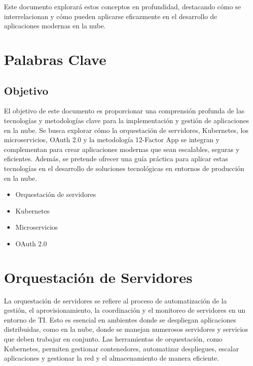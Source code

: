 \documentclass{article}
\begin{document}
Este documento explorará estos conceptos en profundidad, destacando cómo se interrelacionan y cómo pueden aplicarse eficazmente en el desarrollo de aplicaciones modernas en la nube.\\

\section{Palabras Clave}
\subsection{Objetivo}
El objetivo de este documento es proporcionar una comprensión profunda de las tecnologías y metodologías clave para la implementación y gestión de aplicaciones en la nube. Se busca explorar cómo la orquestación de servidores, Kubernetes, los microservicios, OAuth 2.0 y la metodología 12-Factor App se integran y complementan para crear aplicaciones modernas que sean escalables, seguras y eficientes. Además, se pretende ofrecer una guía práctica para aplicar estas tecnologías en el desarrollo de soluciones tecnológicas en entornos de producción en la nube.
\begin{itemize}
    \item Orquestación de servidores
    \item Kubernetes
    \item Microservicios
    \item OAuth 2.0
\end{itemize}

\section{Orquestación de Servidores}
\onehalfspacing
La orquestación de servidores se refiere al proceso de automatización de la gestión, el aprovisionamiento, la coordinación y el monitoreo de servidores en un entorno de TI. Esto es esencial en ambientes donde se despliegan aplicaciones distribuidas, como en la nube, donde se manejan numerosos servidores y servicios que deben trabajar en conjunto. Las herramientas de orquestación, como Kubernetes, permiten gestionar contenedores, automatizar despliegues, escalar aplicaciones y gestionar la red y el almacenamiento de manera eficiente.
\end{document}
